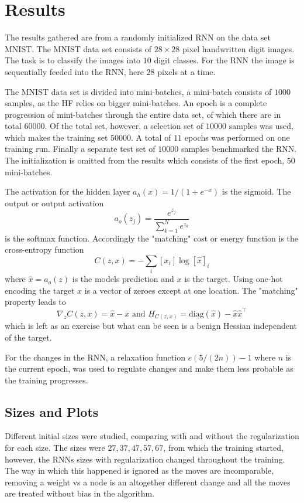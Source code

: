\chapter{Results}

The results gathered are from a randomly initialized RNN on the data set MNIST. The MNIST data set consists of $28 \times 28$ pixel handwritten digit images. The task is to classify the images into $10$ digit classes. For the RNN the image is sequentially feeded into the RNN, here $28$ pixels at a time. 

The MNIST data set is divided into mini-batches, a mini-batch consists of $1000$ samples, as the HF relies on bigger mini-batches. An epoch is a complete progression of mini-batches through the entire data set, of which there are in total $60 000$. Of the total set, however, a selection set of $10 000$ samples was used, which makes the training set $50000$. A total of $11$ epochs was performed on one training run. Finally a separate test set of $10000$ samples benchmarked the RNN. The initialization is omitted from the results which consists of the first epoch, $50$ mini-batches.

The activation for the hidden layer $a_h(x) = 1/(1 + e^{-x})$ is the sigmoid. The output or output activation \[a_o(z_j) = \frac{e^{z_j}}{\sum_{k=1}^N e^{z_k}}\] is the softmax function. Accordingly the "matching" cost or energy function is the cross-entropy function \[C(z,x) = - \sum_i [x_i] \log [\hat{x}]_i\] where $\hat{x} = a_o(z)$ is the models prediction and $x$ is the target. Using one-hot encoding the target $x$ is a vector of zeroes except at one location. The "matching" property leads to \[\nabla_z C(z,x) = \hat{x} - x \text{ and } H_{C(z,x)} = \text{diag}(\hat{x}) - \hat{x} \hat{x}^\top\] which is left as an exercise but what can be seen is a benign Hessian independent of the target. 

For the changes in the RNN, a relaxation function $e(5/(2n)) - 1$ where $n$ is the current epoch, was used to regulate changes and make them less probable as the training progresses.

\section{Sizes and Plots}

Different initial sizes were studied, comparing with and without the regularization for each size. The sizes were $27, 37, 47, 57, 67$, from which the training started, however, the RNNs sizes with regularization changed throughout the training. The way in which this happened is ignored as the moves are incomparable, removing a weight vs a node is an altogether different change and all the moves are treated without bias in the algorithm. 

